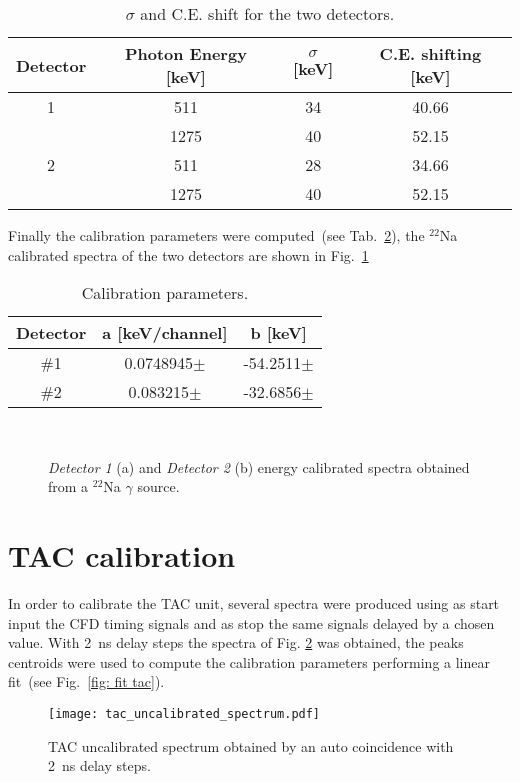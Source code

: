 \begin{table}[h!]
	\centering
	\begin{tabular}{cccc}
		\toprule
		\toprule
		Detector & Photon Energy [keV] & $\sigma$ [keV] & C.E. shifting [keV] \\
		\midrule
		1&511 & 34& 40.66 \\
		&1275 & 40 & 52.15\\
		\midrule
		2&511 & 28 & 34.66 \\
		&1275 & 40 & 52.15\\
		\bottomrule
		\bottomrule
	\end{tabular}
	\caption{$\sigma$ and C.E. shift for the two detectors.}
	\label{tab:CEshift}
\end{table}
\newpage
Finally the calibration parameters were computed~(see Tab.~\ref{tab:Cal_par}), the $^{22}$Na  calibrated spectra of the two detectors are shown in Fig.~\ref{fig: calibrated energy spectra}

\begin{table}[h!]
	\centering
	\begin{tabular}{ccc}
		\toprule
		\toprule
		Detector & a [keV/channel] & b [keV] \\
		\midrule
		\#1 &  0.0748945$\pm$ & -54.2511$\pm$ \\
		\#2 & 0.083215$\pm$ & -32.6856$\pm$ \\
		\bottomrule
		\bottomrule
	\end{tabular}
	\caption{Calibration parameters.}
	\label{tab:Cal_par}
\end{table}

\begin{figure}[h!]
\centering
{} \quad
{} \\
\caption{\emph{Detector 1} (a) and \emph{Detector 2} (b) energy calibrated spectra  obtained from a $^{22}$Na $\gamma$ source.}
\label{fig: calibrated energy spectra}
\end{figure}

\clearpage
\section*{TAC calibration}
In order to calibrate the TAC unit, several spectra were produced using as start input the CFD timing signals and as stop the same signals delayed by a chosen value. With 2~ns delay steps the spectra of Fig. \ref{fig: uncalibrated TAC} was obtained, the peaks centroids were used to compute the calibration parameters performing a linear fit~(see Fig.~\ref{fig: fit tac}). 
\begin{figure}[h!]
\centering
\texttt{[image: tac\_uncalibrated\_spectrum.pdf]}
\caption{TAC uncalibrated spectrum obtained by an auto coincidence with 2~ns delay steps. }
\label{fig: uncalibrated TAC}
\end{figure}


